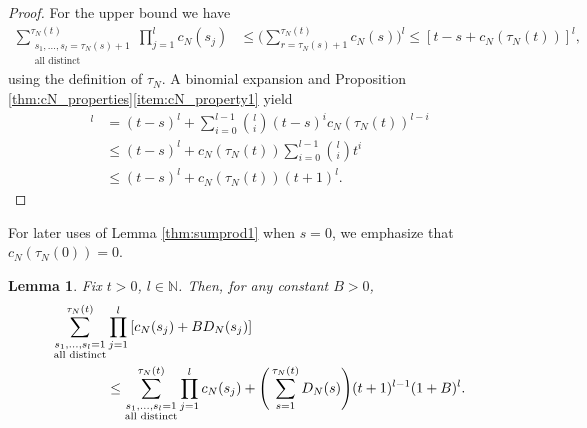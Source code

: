\documentclass[12pt,authoryear]{article}
\newtheorem{lemma}{Lemma}
\theoremstyle{definition}
\newcommand{\1}[1]{\mathbbm{1}_{#1}}
\begin{document}
\begin{proof}
For the upper bound we have
\begin{align*}
\sum_{\substack{ s_1, \dots, s_l =\tau_N(s) + 1 \\ \text{all distinct} }}^{\tau_N(t)} 
        \prod_{j=1}^l c_N(s_j)
&\leq \Bigg( \sum_{r=\tau_N(s)+1}^{\tau_N(t)} c_N(s) \Bigg)^l \leq \left[ t - s + c_N(\tau_N(t)) \right]^l ,
\end{align*}
using the definition of $\tau_N$.
A binomial expansion and Proposition \ref{thm:cN_properties}\ref{item:cN_property1} yield
\begin{align*}
[ t - s + c_N(\tau_N(t)) ]^l &= (t - s)^l + \sum_{i=0}^{l-1} \binom{l}{i} (t - s)^i c_N(\tau_N(t))^{l-i}\\
&\leq (t - s)^l + c_N(\tau_N(t)) \sum_{i=0}^{l-1} \binom{l}{i} t^i \\
&\leq (t - s)^l + c_N(\tau_N(t)) (t+1)^l.
\end{align*}
\end{proof}
For later uses of Lemma \ref{thm:sumprod1} when $s = 0$, we emphasize that $c_N(\tau_N(0)) = 0$.

\begin{lemma}\label{thm:sumprod2}
Fix $t>0$, $l\in\mathbb{N}$.
Then, for any constant $B>0$,
\begin{align*}
\sum_{\substack{ s_1, \dots, s_l =1 \\ \text{\normalfont{all distinct}} }}^{\tau_N(t)} &
        \prod_{j=1}^l \left[ c_N(s_j) + B D_N(s_j) \right] \\
&\leq \sum_{\substack{ s_1, \dots, s_l =1 \\ \text{\normalfont{all distinct}} }}^{\tau_N(t)} 
        \prod_{j=1}^l c_N(s_j)
        + \Bigg( \sum_{s=1}^{\tau_N(t)} D_N(s) \Bigg) (t+1)^{l-1} (1+B)^l .
\end{align*}
\end{lemma}
\end{document}

